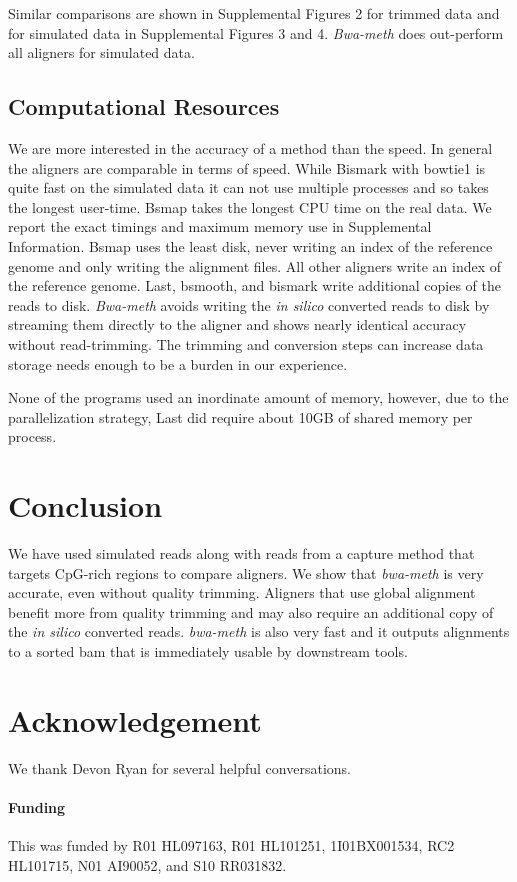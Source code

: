 \documentclass{bioinfo}
\begin{document}
Similar comparisons are shown in Supplemental Figures 2
for trimmed data and for simulated data in Supplemental Figures 3 and 4.
\textit{Bwa-meth} does out-perform all aligners for simulated data.

\subsection{Computational Resources}
We are more interested in the accuracy of a
method than the speed. In general the aligners are comparable in terms of
speed. While Bismark with bowtie1 is quite fast on the simulated data it
can not use multiple processes and so takes the longest user-time. Bsmap
takes the longest CPU time on the real data. We report the exact 
timings and maximum memory use in Supplemental Information.
Bsmap uses the least disk, never writing an index of the reference genome
and only writing the alignment files. All other aligners write an index of
the reference genome. Last, bsmooth, and bismark write additional copies of the
reads to disk.
\textit{Bwa-meth} avoids writing the \emph{in silico}
converted reads to disk by streaming them directly to the aligner and shows
nearly identical accuracy without read-trimming. The trimming and conversion
steps can increase data storage needs enough to be a burden in our experience. 

None of the programs used an inordinate amount of memory, however, due to
the parallelization strategy, Last did require about 10GB of shared memory
per process.

\section{Conclusion}
We have used simulated reads along with reads from a capture method that
targets CpG-rich regions to compare aligners.
We show that \textit{bwa-meth} is very accurate, even without quality trimming.
Aligners that use global alignment benefit more from quality trimming and may
also require an additional copy of the \emph{in silico} converted reads.
\textit{bwa-meth} is also very fast and it outputs alignments to a sorted bam
that is immediately usable by downstream tools.

\section*{Acknowledgement}
We thank Devon Ryan for several helpful conversations.
\paragraph{Funding\textcolon} This was funded by R01 HL097163, R01 HL101251, 1I01BX001534, RC2 HL101715, N01 AI90052, and S10 RR031832.
%
%
%
%
%
%
%
%
%



    
\end{document}
